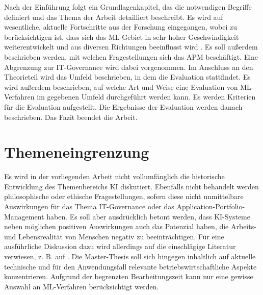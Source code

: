 Nach der Einführung folgt ein Grundlagenkapitel, das die notwendigen Begriffe definiert und das Thema der Arbeit detailliert beschreibt. Es wird auf wesentliche, aktuelle Fortschritte aus der Forschung eingegangen, wobei zu berücksichtigen ist, dass sich das ML-Gebiet in sehr hoher Geschwindigkeit weiterentwickelt und aus diversen Richtungen beeinflusst wird \cite[S. 146]{Gupta}. Es soll außerdem beschrieben werden, mit welchen Fragestellungen sich das APM beschäftigt. Eine Abgrenzung zur IT-Governance wird dabei vorgenommen. Im Anschluss an den Theorieteil wird das Umfeld beschrieben, in dem die Evaluation stattfindet. Es wird außerdem beschrieben, auf welche Art und Weise eine Evaluation von ML-Verfahren im gegebenen Umfeld durchgeführt werden kann. Es werden Kriterien für die Evaluation aufgestellt. Die Ergebnisse der Evaluation werden danach beschrieben. Das Fazit beendet die Arbeit.

\section{Themeneingrenzung}

Es wird in der vorliegenden Arbeit nicht vollumfänglich die historische Entwicklung des Themenbereichs KI diskutiert. Ebenfalls nicht behandelt werden philosophische oder ethische Fragestellungen, sofern diese nicht unmittelbare Auswirkungen für das Thema IT-Governance oder das Application-Portfolio-Management haben. Es soll aber ausdrücklich betont werden, dass KI-Systeme neben möglichen positiven Auswirkungen auch das Potenzial haben, die Arbeits- und Lebensrealität von Menschen negativ zu beeinträchtigen. Für eine ausführliche Diskussion dazu wird allerdings auf die einschlägige Literatur verwiesen, z. B. auf \cite[S. 11-16]{Ertel}. Die Master-Thesis soll sich hingegen inhaltlich auf aktuelle technische und für den Anwendungsfall relevante betriebswirtschaftliche Aspekte konzentrieren. 
Aufgrund der begrenzten Bearbeitungszeit kann nur eine gewisse Auswahl an ML-Verfahren berücksichtigt werden.


